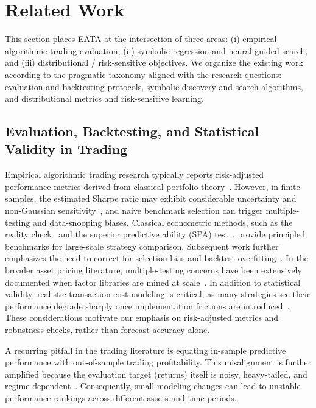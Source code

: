 \section{Related Work}
\label{sec:related}

This section places EATA at the intersection of three areas: (i) empirical algorithmic trading evaluation, (ii) symbolic regression and neural-guided search, and (iii) distributional / risk-sensitive objectives. We organize the existing work according to the pragmatic taxonomy aligned with the research questions: evaluation and backtesting protocols, symbolic discovery and search algorithms, and distributional metrics and risk-sensitive learning.
\subsection{Evaluation, Backtesting, and Statistical Validity in Trading}

Empirical algorithmic trading research typically reports risk-adjusted performance metrics derived from classical portfolio theory~\cite{markowitz1952portfolio,sharpe1966mutual}. However, in finite samples, the estimated Sharpe ratio may exhibit considerable uncertainty and non-Gaussian sensitivity~\cite{lo2002sharpe_stats,ledoit2008sharpe}, and naive benchmark selection can trigger multiple-testing and data-snooping biases. Classical econometric methods, such as the reality check~\cite{white2000reality_check} and the superior predictive ability (SPA) test~\cite{hansen2005spa}, provide principled benchmarks for large-scale strategy comparison. Subsequent work further emphasizes the need to correct for selection bias and backtest overfitting~\cite{bailey2014deflated_sharpe,bailey2017pbo}. In the broader asset pricing literature, multiple-testing concerns have been extensively documented when factor libraries are mined at scale~\cite{harvey2016multiple_testing}. In addition to statistical validity, realistic transaction cost modeling is critical, as many strategies see their performance degrade sharply once implementation frictions are introduced~\cite{keim1997transaction_costs}. These considerations motivate our emphasis on risk-adjusted metrics and robustness checks, rather than forecast accuracy alone.

A recurring pitfall in the trading literature is equating in-sample predictive performance with out-of-sample trading profitability. This misalignment is further amplified because the evaluation target (returns) itself is noisy, heavy-tailed, and regime-dependent~\cite{cont2001empirical}. Consequently, small modeling changes can lead to unstable performance rankings across different assets and time periods.

